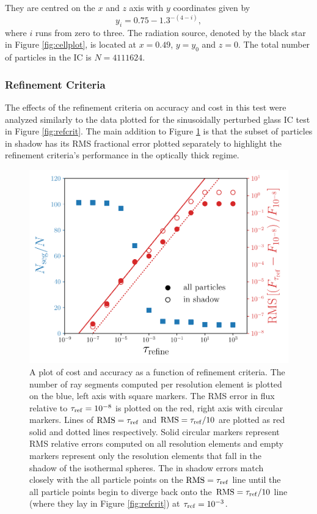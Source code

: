 \documentclass[fleq,usenatbib]{mnras}
\newcommand{\tr}{\tau_{\rm ref}}
\begin{document}
They are centred on the $x$ and $z$ axis with $y$ coordinates given by
\begin{equation}
y_i = 0.75 - 1.3^{-(4-i)},
\end{equation}
where $i$ runs from zero to three. The radiation source, denoted by the black 
star in Figure \ref{fig:cellplot}, is located at $x=0.49$, $y=y_0$ and $z=0$. 
The total number of particles in the IC is $N=4111624$.

\subsubsection{Refinement Criteria}
The effects of the refinement criteria on accuracy and cost in this test were 
analyzed similarly to the data plotted for the sinusoidally perturbed glass IC 
test in Figure \ref{fig:refcrit}. The main addition to Figure \ref{fig:isosph} 
is that the subset of particles in shadow has its RMS fractional error plotted 
separately to highlight the refinement criteria's performance in the optically 
thick regime.
\begin{figure}
\includegraphics[width=1\linewidth]{Figures/isothermal_spheres.pdf}
\caption{A plot of cost and accuracy as a function of refinement criteria. The 
number of ray segments computed per resolution element is plotted on the blue,
left axis with square markers. The RMS error in flux relative to $\tr
=10^{-8}$ is plotted on the red, right axis with circular markers. Lines of 
${\rm RMS} = \tr$ and ${\rm RMS} = \tr/10$ are plotted as red solid and dotted 
lines respectively. Solid circular markers represent RMS relative errors 
computed on all resolution elements and empty markers represent only the 
resolution elements that fall in the shadow of the isothermal spheres. The 
in shadow errors match closely with the all particle points on the ${\rm RMS} 
= \tr$ line until the all particle points begin to diverge back onto the 
${\rm RMS} = \tr/10$ line (where they lay in Figure \ref{fig:refcrit}) at 
$\tr=10^{-3}$.}
\label{fig:isosph}
\end{figure}
\end{document}
